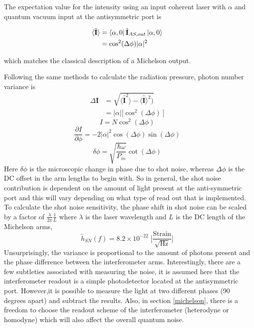 		The expectation value for the intensity using an input coherent laser with $\alpha$ and quantum vacuum input at the antisymmetric port is
		
		\begin{equation}
		\begin{aligned}
		\langle \hat{\mathbf{I}} \rangle 	&= \bra{\alpha,0} \hat{\mathbf{I}}_{AS,out} \ket{\alpha,0}\\
							&= \cos^2(\Delta \phi) \vert \alpha \vert^2
		\end{aligned}
		\end{equation}
		
		which matches the classical description of a Michelson output.
		
		Following the same methods to calculate the radiation pressure, photon number variance is 
		\begin{equation} 
		\begin{aligned}
		\Delta \mathbf{I} 	&= \sqrt{\langle \mathbf{\hat{I}}^2 \rangle  - \langle \mathbf{\hat{I}} \rangle^2)} \\
							&= \vert \alpha \vert \big[ \cos^2(\Delta \phi)\ \big] 
		\end{aligned}
		\end{equation}
		\begin{equation}
		I = N \cos^2(\Delta \phi)
		\end{equation}
		\begin{equation}
		\frac{\partial I}{\partial \phi} = - 2 \vert \alpha \vert^2\cos(\Delta \phi) \sin(\Delta \phi)
		\end{equation}
		\begin{equation}
		\delta \phi = \sqrt{\frac{\hbar \omega}{ P_{in}}} \cot(\Delta \phi)
		\end{equation}
		Here $\delta \phi$ is the microscopic change in phase due to shot noise, whereas $\Delta\phi$ is the DC offset in the arm lengths to begin with. So in general, the shot noise contribution is dependent on the amount of light present at the anti-symmetric port and this will vary depending on what type of read out that is implemented.  To calculate the shot noise sensitivity, the phase shift in shot noise can be scaled by a factor of $\frac{\lambda}{2 \pi}\frac{1}{L}$ where $\lambda$ is the laser wavelength and $L$ is the DC length of the Michelson arms,
		\begin{equation}
		\tilde{h}_{SN}(f) = 8.2\times 10^{-22} \; \bigg[ \frac{\text{Strain}}{\sqrt{\text{Hz}}}\bigg]
		\end{equation}
		Unsurprisingly, the variance is proportional to the amount of photons present and the phase difference between the interferometer arms.
		Interestingly, there are a few subtleties associated with measuring the noise, it is assumed here that the interferometer readout is a simple photodetector located at the antisymmetric port.  However,it is possible to measure the light at two different phases (90 degrees apart) and subtract the results.   Also, in section \ref{michelson}, there is a freedom to choose the readout scheme of the interferometer (heterodyne or homodyne) which will also affect the overall quantum noise.
		
